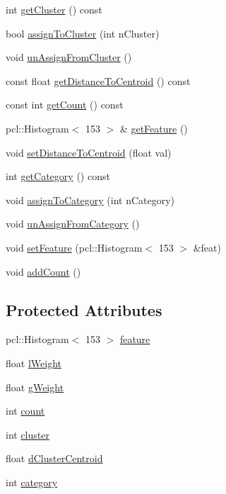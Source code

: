 \begin{DoxyCompactItemize}
\item 
int \hyperlink{class_feature_metadata_a4691adf4f46586826fd8c0667119fc52}{get\+Cluster} () const
\item 
bool \hyperlink{class_feature_metadata_a896922c34a6bf90f4c22b8e9546108dc}{assign\+To\+Cluster} (int n\+Cluster)
\item 
void \hyperlink{class_feature_metadata_a203acc4e77eaf40cb42ac446c92af241}{un\+Assign\+From\+Cluster} ()
\item 
const float \hyperlink{class_feature_metadata_a4736658ecb89297dd9bad9c701f59e8f}{get\+Distance\+To\+Centroid} () const
\item 
const int \hyperlink{class_feature_metadata_a52510d086e0b5fdc1b34b718c3bebd14}{get\+Count} () const
\item 
pcl\+::\+Histogram$<$ 153 $>$ \& \hyperlink{class_feature_metadata_a92f0b1da1d3892508fa358a58946060a}{get\+Feature} ()
\item 
void \hyperlink{class_feature_metadata_abd9ec7695ed8e497aa1101695d3b5143}{set\+Distance\+To\+Centroid} (float val)
\item 
int \hyperlink{class_feature_metadata_a8121654a5fc7422adb41cd04ddb0bc72}{get\+Category} () const
\item 
void \hyperlink{class_feature_metadata_acc32427e65eab74731498c4a3f0eca34}{assign\+To\+Category} (int n\+Category)
\item 
void \hyperlink{class_feature_metadata_a64772c40574899bb2b3985b1bea2a819}{un\+Assign\+From\+Category} ()
\item 
void \hyperlink{class_feature_metadata_acbb60bf43880c89dacd3a81b4e2d0c43}{set\+Feature} (pcl\+::\+Histogram$<$ 153 $>$ \&feat)
\item 
void \hyperlink{class_feature_metadata_a2c493838e535578c670052b08b61d069}{add\+Count} ()
\end{DoxyCompactItemize}
\subsection*{Protected Attributes}
\begin{DoxyCompactItemize}
\item 
pcl\+::\+Histogram$<$ 153 $>$ \hyperlink{class_feature_metadata_a0b288799d230ccf13d34efd60165ebb6}{feature}
\item 
float \hyperlink{class_feature_metadata_a5b7a2efcdc98b2fc62fd7e47eceed296}{l\+Weight}
\item 
float \hyperlink{class_feature_metadata_acb096e77efd9a31c51b99682160324ce}{g\+Weight}
\item 
int \hyperlink{class_feature_metadata_a722c6a86c099fc76fe4d25aedaf98c1c}{count}
\item 
int \hyperlink{class_feature_metadata_a7f5a6347721de970e0dd5abf4b0a8455}{cluster}
\item 
float \hyperlink{class_feature_metadata_ab8a28f696d38b7bdd3aeef92a3453bcf}{d\+Cluster\+Centroid}
\item 
int \hyperlink{class_feature_metadata_a30e96aabc8090f41b8136cbb274da383}{category}
\end{DoxyCompactItemize}


